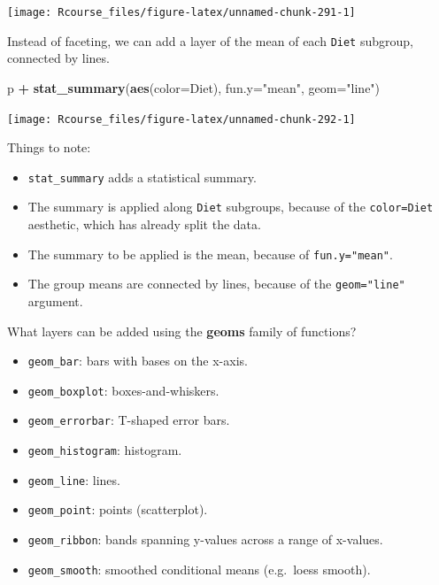 \documentclass[]{book}
\newenvironment{Shaded}{\begin{snugshade}}{\end{snugshade}}
\newcommand{\DataTypeTok}[1]{\textcolor[rgb]{0.13,0.29,0.53}{#1}}
\newcommand{\KeywordTok}[1]{\textcolor[rgb]{0.13,0.29,0.53}{\textbf{#1}}}
\newcommand{\NormalTok}[1]{#1}
\newcommand{\OperatorTok}[1]{\textcolor[rgb]{0.81,0.36,0.00}{\textbf{#1}}}
\newcommand{\StringTok}[1]{\textcolor[rgb]{0.31,0.60,0.02}{#1}}
\providecommand{\tightlist}{%
  \setlength{\itemsep}{0pt}\setlength{\parskip}{0pt}}
\theoremstyle{definition}
\theoremstyle{definition}
\theoremstyle{definition}
\theoremstyle{remark}
\begin{document}
\texttt{[image: Rcourse\_files/figure-latex/unnamed-chunk-291-1]}

Instead of faceting, we can add a layer of the mean of each \texttt{Diet} subgroup, connected by lines.

\begin{Shaded}
\begin{Highlighting}[]
\NormalTok{p }\OperatorTok{+}\StringTok{ }\KeywordTok{stat_summary}\NormalTok{(}\KeywordTok{aes}\NormalTok{(}\DataTypeTok{color=}\NormalTok{Diet), }\DataTypeTok{fun.y=}\StringTok{"mean"}\NormalTok{, }\DataTypeTok{geom=}\StringTok{"line"}\NormalTok{)}
\end{Highlighting}
\end{Shaded}

\texttt{[image: Rcourse\_files/figure-latex/unnamed-chunk-292-1]}

Things to note:

\begin{itemize}
\tightlist
\item
  \texttt{stat\_summary} adds a statistical summary.
\item
  The summary is applied along \texttt{Diet} subgroups, because of the \texttt{color=Diet} aesthetic, which has already split the data.
\item
  The summary to be applied is the mean, because of \texttt{fun.y="mean"}.
\item
  The group means are connected by lines, because of the \texttt{geom="line"} argument.
\end{itemize}

What layers can be added using the \textbf{geoms} family of functions?

\begin{itemize}
\tightlist
\item
  \texttt{geom\_bar}: bars with bases on the x-axis.
\item
  \texttt{geom\_boxplot}: boxes-and-whiskers.
\item
  \texttt{geom\_errorbar}: T-shaped error bars.
\item
  \texttt{geom\_histogram}: histogram.
\item
  \texttt{geom\_line}: lines.
\item
  \texttt{geom\_point}: points (scatterplot).
\item
  \texttt{geom\_ribbon}: bands spanning y-values across a range of x-values.
\item
  \texttt{geom\_smooth}: smoothed conditional means (e.g.~loess smooth).
\end{itemize}
\end{document}
